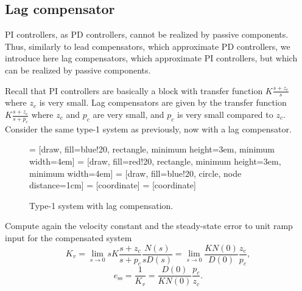 \documentclass[a4paper,11pt]{report}
\theoremstyle{definition}
\newcommand{\sse}{\mathrm{ss}}
\begin{document}
\subsection{Lag compensator}
\label{sec:lag}

PI controllers, as PD controllers, cannot be realized by passive
components. Thus, similarly to lead compensators, which approximate PD
controllers, we introduce here lag compensators, which approximate PI
controllers, but which can be realized by passive components.

Recall that PI controllers are basically a block with transfer
function $K\frac{s+z_c}{s}$ where $z_c$ is very small. Lag
compensators are given by the transfer function $K\frac{s+z_c}{s+p_c}$
where $z_c$ and $p_c$ are very small, and $p_c$ is very small compared
to $z_c$. Consider the same type-1 system as previously, now with a
lag compensator.

\begin{figure}[H]
  \label{fig:pddesign}
  \centering
   = [draw, fill=blue!20, rectangle, minimum height=3em, minimum width=4em]
   = [draw, fill=red!20, rectangle, minimum height=3em, minimum width=4em]
   = [draw, fill=blue!20, circle, node distance=1cm]
   = [coordinate]
   = [coordinate]
  \caption{Type-1 system with lag compensation.}
\end{figure}

Compute again the velocity constant and the steady-state error to unit
ramp input for the compensated system
\[
K_v = \lim_{s\to 0} sK\frac{s+z_c}{s+p_c}\frac{N(s)}{sD(s)} = \lim_{s\to 0}
\frac{KN(0)}{D(0)}\frac{z_c}{p_c},
\]
\[
e_\sse = \frac{1}{K_v} = \frac{D(0)}{KN(0)}\frac{p_c}{z_c}.
\]
\end{document}
